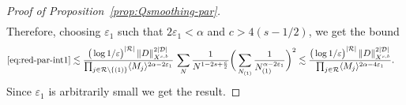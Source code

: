 \documentclass[11pt, xcolor = dvipsnames,reqno
]{amsart}
\theoremstyle{definition}
\theoremstyle{remark}
\begin{document}
\begin{proof}[Proof of Proposition~\ref{prop:Qsmoothing-par}]
\begin{align*}
\end{align*} 
Therefore, choosing $\varepsilon_1$ such that $ 2\varepsilon_1  < \alpha$ and $c > 4 (s  - 1/2)$, we get the bound
\begin{align}
    \eqref{eq:red-par-int1}
    &\lesssim \frac{ \big(  \log 1/\varepsilon \big)^{|\mathcal{R}|} \, \|D\|_{X^{s,b}}^{2|\mathcal{D}|}}{ \prod_{j \in \mathcal{R} \setminus \{(1)\}}  \langle M_j \rangle^{2\alpha - 2\varepsilon_1}} \, 
    \sum_N \frac{1}{N^{1 - 2s + \frac{c}{2}}} \bigg( \sum_{N_{(1)}} \frac{1}{N_{(1)}^{\alpha  - 2\varepsilon_1}} \bigg)^2
    \lesssim  \frac{\big(  \log 1/\varepsilon \big)^{|\mathcal{R}|} \, \|D\|_{X^{s,b}}^{2|\mathcal{D}|}}{ \prod_{j \in \mathcal{R}} \langle M_j \rangle^{2\alpha  - 4\varepsilon_1}}.
\end{align} 
Since $\varepsilon_1$ is arbitrarily small we get the result. 
\end{proof}
\end{document}
